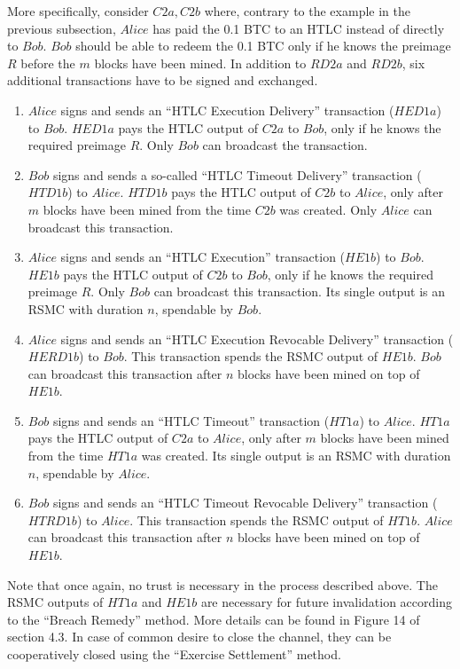 \begin{itemize}
    More specifically, consider $C2a, C2b$ where, contrary to the example in the previous
    subsection, $Alice$ has paid the 0.1 BTC to an HTLC instead of directly to $Bob$.
    $Bob$ should be able to redeem the 0.1 BTC only if he knows the preimage $R$ before
    the $m$ blocks have been mined. In addition to $RD2a$ and $RD2b$, six additional
    transactions have to be signed and exchanged.
    \begin{enumerate}
      \item $Alice$ signs and sends an ``HTLC Execution Delivery'' transaction ($HED1a$) to
      $Bob$. $HED1a$ pays the HTLC output of $C2a$ to $Bob$, only if he knows the required
      preimage $R$. Only $Bob$ can broadcast the transaction.
      \item $Bob$ signs and sends a so-called ``HTLC Timeout Delivery'' transaction
      ($HTD1b$) to $Alice$. $HTD1b$ pays the HTLC output of $C2b$ to $Alice$, only after
      $m$ blocks have been mined from the time $C2b$ was created. Only $Alice$ can
      broadcast this transaction.
      \item $Alice$ signs and sends an ``HTLC Execution'' transaction ($HE1b$) to $Bob$.
      $HE1b$ pays the HTLC output of $C2b$ to $Bob$, only if he knows the required
      preimage $R$. Only $Bob$ can broadcast this transaction. Its single output is an
      RSMC with duration $n$, spendable by $Bob$.
      \item $Alice$ signs and sends an ``HTLC Execution Revocable Delivery'' transaction
      ($HERD1b$) to $Bob$. This transaction spends the RSMC output of $HE1b$. $Bob$ can
      broadcast this transaction after $n$ blocks have been mined on top of $HE1b$.
      \item $Bob$ signs and sends an ``HTLC Timeout'' transaction ($HT1a$) to $Alice$.
      $HT1a$ pays the HTLC output of $C2a$ to $Alice$, only after $m$ blocks have been
      mined from the time $HT1a$ was created. Its single output is an RSMC with duration
      $n$, spendable by $Alice$.
      \item $Bob$ signs and sends an ``HTLC Timeout Revocable Delivery'' transaction
      ($HTRD1b$) to $Alice$. This transaction spends the RSMC output of $HT1b$. $Alice$
      can broadcast this transaction after $n$ blocks have been mined on top of $HE1b$.
    \end{enumerate}
    Note that once again, no trust is necessary in the process described above. The
    RSMC outputs of $HT1a$ and $HE1b$ are necessary for future invalidation according to
    the ``Breach Remedy'' method. More details can be found in Figure 14 of section 4.3. In
    case of common desire to close the channel, they can be cooperatively closed using the
    ``Exercise Settlement'' method. \\


\end{itemize}
